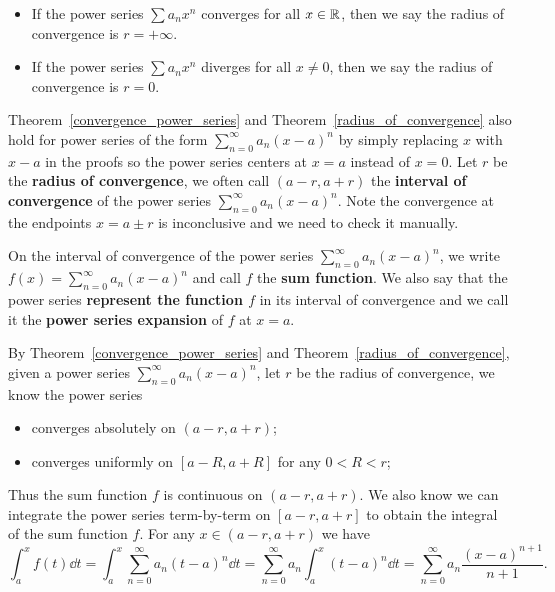 \documentclass[a4paper]{ctexart}
\begin{document}
    \begin{myrmk}
        \leavevmode
        \begin{itemize}
            \item If the power series $\sum a_n x^n$ converges for all $x\in \mathbb{R}$, then we say the radius of convergence is $r = +\infty$.
            \item If the power series $\sum a_n x^n$ diverges for all $x\neq 0$, then we say the radius of convergence is $r=0$.
        \end{itemize}
    \end{myrmk}
    \begin{myrmk}
        Theorem~\ref{convergence_power_series} and Theorem~\ref{radius_of_convergence} also hold for power series of the form $\displaystyle \sum_{n=0}^\infty a_n (x-a)^n$ by simply replacing $x$ with $x-a$ in the proofs so the power series centers at $x=a$ instead of $x=0$. Let $r$ be the \textbf{radius of convergence}, we often call $(a-r,a+r)$ the \textbf{interval of convergence} of the power series $\displaystyle \sum_{n=0}^\infty a_n (x-a)^n$. Note the convergence at the endpoints $x=a\pm r$ is inconclusive and we need to check it manually.
    \end{myrmk}
    \begin{mydef}
        On the interval of convergence of the power series $\displaystyle \sum_{n=0}^\infty a_n (x-a)^n$, we write $f(x) = \displaystyle \sum_{n=0}^\infty a_n (x-a)^n$ and call $f$ the \textbf{sum function}. We also say that the power series \textbf{represent the function $f$} in its interval of convergence and we call it the \textbf{power series expansion} of $f$ at $x=a$. 
    \end{mydef}
    \begin{myrmk}
        By Theorem~\ref{convergence_power_series} and Theorem~\ref{radius_of_convergence}, given a power series $\displaystyle \sum_{n=0}^\infty a_n (x-a)^n$, let $r$ be the radius of convergence, we know the power series
        \begin{itemize}
            \item converges absolutely on $(a-r,a+r)$;
            \item converges uniformly on $[a-R,a+R]$ for any $0<R<r$;
        \end{itemize}
        Thus the sum function $f$ is continuous on $(a-r,a+r)$. We also know we can integrate the power series term-by-term on $[a-r,a+r]$ to obtain the integral of the sum function $f$. For any $x\in(a-r,a+r)$ we have
        \[
        \int_a^x f(t) \dd t = \int_a^x \sum_{n=0}^\infty a_n (t-a)^n \dd t = \sum_{n=0}^\infty a_n \int_a^x (t-a)^n \dd t = \sum_{n=0}^\infty a_n \frac{(x-a)^{n+1}}{n+1}.
        \]
    \end{myrmk}
\end{document}
